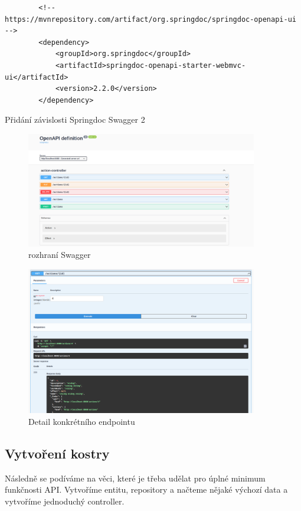\begin{listing}[H]
    \begin{verbatim}
        <!-- https://mvnrepository.com/artifact/org.springdoc/springdoc-openapi-ui -->
        <dependency>
            <groupId>org.springdoc</groupId>
            <artifactId>springdoc-openapi-starter-webmvc-ui</artifactId>
            <version>2.2.0</version>
        </dependency>
    \end{verbatim}
    \caption{Přidání závislosti Springdoc Swagger 2}
    \label{code:swagger-dependency}
\end{listing}

\begin{figure}[H]
    \centering
    \includegraphics[width=0.9\textwidth]{../images/implementation/swagger.png}
    \caption{rozhraní Swagger}
    \label{fig:swagger-ui}
\end{figure}
\begin{figure}[H]
    \centering
    \includegraphics[width=0.9\textwidth]{../images/implementation/swaggger endpoint.png}
    \caption{Detail konkrétního endpointu}
    \label{fig:swagger-ui}
\end{figure}


\subsection{Vytvoření kostry}
Následně se podíváme na věci, které je třeba udělat pro úplné minimum funkčnosti API. Vytvoříme entitu, repository a načteme nějaké výchozí data a vytvoříme jednoduchý controller.

